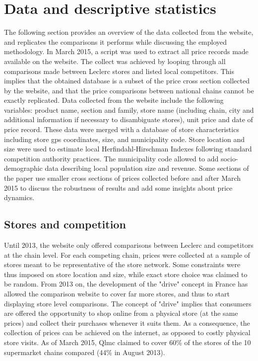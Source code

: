 \documentclass[english]{article}
\begin{document}
\section{Data and descriptive statistics}

The following section provides an overview of the data collected from the website, and replicates the comparisons it performs while discussing the employed methodology. In March 2015, a script was used to extract all price records made available on the website. The collect was achieved by looping through all comparisons made between Leclerc stores and listed local competitors. This implies that the obtained database is a subset of the price cross section collected by the website, and that the price comparisons between national chains cannot be exactly replicated. Data collected from the website include the following variables: product name, section and family, store name (including chain, city and additional information if necessary to disambiguate stores), unit price and date of price record. These data were merged with a database of store characteristics including store gps coordinates, size, and municipality code. Store location and size were used to estimate local Herfindahl-Hirschman Indexes following standard competition authority practices. The municipality code allowed to add socio-demographic data describing local population size and revenue. Some sections of the paper use smaller cross sections of prices collected before and after March 2015 to discuss the robustness of results and add some insights about price dynamics.


\subsection{Stores and competition}

Until 2013, the website only offered comparisons between Leclerc and competitors at the chain level. For each competing chain, prices were collected at a sample of stores meant to be representative of the store network. Some constraints were thus imposed on store location and size, while exact store choice was claimed to be random. From 2013 on, the development of the "drive" concept in France has allowed the comparison website to cover far more stores, and thus to start displaying store level comparisons. The concept of "drive" implies that consumers are offered the opportunity to shop online from a physical store (at the same prices) and collect their purchases whenever it suits them. As a consequence, the collection of prices can be achieved on the internet, as opposed to costly physical store visits. As of March 2015, Qlmc claimed to cover 60\% of the stores of the 10 supermarket chains compared (44\% in August 2013).
\end{document}
